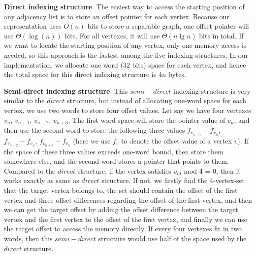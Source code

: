 \documentclass[12pt,glossary]{dalthesis}
\begin{document}
\bigskip
\bigskip

\textbf{Direct indexing structure}. The easiest way to access the starting position of 
any adjacency list is to store an offset pointer for each vertex. Because our representation uses $O(n)$ bits to store a separable graph, one offset pointer will use $\Theta (\log (n))$ bits. For all vertexes, it will use $ \Theta (n\lg n)$ bits in total. If we want to locate the starting position of any vertex, only one memory access is needed, so this approach is the fastest among the five indexing structures. In our implementation, we allocate one word (32 bits) space for each vertex, and hence the total space for this direct indexing structure is 4$n$ bytes.

\bigskip
\bigskip

\textbf{Semi-direct indexing structure}. This $semi-direct$ indexing structure is very similar to the $direct$ structure, but instead of allocating one-word space for each vertex, we use two words to store four offset values. Let say we have four vertexes $v_{n}$, $v_{n+1}$, $v_{n+2}$, $v_{n+3}$, The first word space will store the pointer value of $v_{n}$, and then use the second word to store the following three values $f_{v_{n+1}}-f_{v_{n}}$, $f_{v_{n+2}}-f_{v_{n}}$, $f_{v_{n+3}}-f_{v_{n}}$ (here we use $f_{v}$ to denote the offset value of a vertex $v$). If the space of these three values exceeds one-word bound, then store them somewhere else, and the second word stores a pointer that points to them. Compared to the $direct$ structure, if the vertex satisfies $v_{id}$ mod 4 = 0, then it works exactly as same as $direct$ structure. If not, we firstly find the 4-vertex-set that the target vertex belongs to, the set should contain the offset of the first vertex and three offset differences regarding the offset of the first vertex, and then we can get the target offset by adding the offset difference between the target vertex and the first vertex to the offset of the first vertex, and finally we can use the target offset to access the memory directly. If every four vertexes fit in two words, then this $semi-direct$ structure would use half of the space used by the $direct$ structure.     

\bigskip
\bigskip
\end{document}
